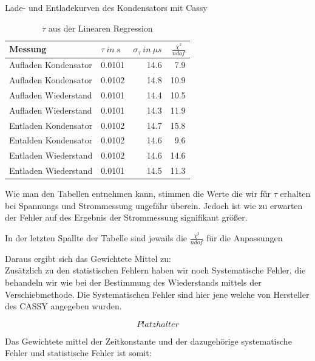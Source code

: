 \documentclass[twoside]{protokoll}
\begin{document}
\begin{aufgabe}{Lade- und Entladekurven des Kondensators mit Cassy}
\begin{table}[H]
        \centering
        \begin{tabularx}{1\textwidth}{X X r r} %
            \toprule
            \textbf{Messung} & \textbf{$\tau \ in \ s$} & \textbf{$\sigma_{\tau} \ in \ \mu s$} & $\frac{\chi^2}{ndof}$ \\
            \midrule
             
            Aufladen Kondensator & 0.0101 & 14.6 & 7.9 \\
            Aufladen Kondensator & 0.0102 & 14.8 & 10.9 \\
            Aufladen Wiederstand & 0.0101 & 14.4 & 10.5 \\
            Aufladen Wiederstand & 0.0101 & 14.3 & 11.9 \\
            Entladen Kondensator & 0.0102 & 14.7 & 15.8 \\
            Entalden Kondensator & 0.0102 & 14.6 & 9.6 \\
            Entladen Wiederstand & 0.0102 & 14.6 & 14.6 \\
            Entladen Wiederstand & 0.0101 & 14.5 & 11.3 \\
             
            \bottomrule
        \end{tabularx}
        \caption{$\tau$ aus der Linearen Regression}
        \label{tab:mytable}
    \end{table}
    

Wie man den Tabellen entnehmen kann, stimmen die Werte die wir für $\tau$ erhalten bei Spannungs und Strommessung ungefähr überein.
Jedoch ist wie zu erwarten der Fehler auf des Ergebnis der Strommessung signifikant größer. 

In der letzten Spallte der Tabelle sind jewails die $\frac{\chi^2}{ndof}$ für die Anpassungen 
 
Daraus ergibt sich das Gewichtete Mittel zu:\\

Zusätzlich zu den statistischen Fehlern haben wir noch Systematische Fehler, die behandeln wir wie bei der Bestimmung des Wiederstands mittels der Verschiebmethode. 
Die Systematischen Fehler sind hier jene welche von Hersteller des CASSY angegeben wurden. 

\begin{equation}
Platzhalter
\end{equation}

Das Gewichtete mittel der Zeitkonstante und der dazugehörige systematische Fehler und statistische Fehler ist somit:


\end{aufgabe}
\end{document}
